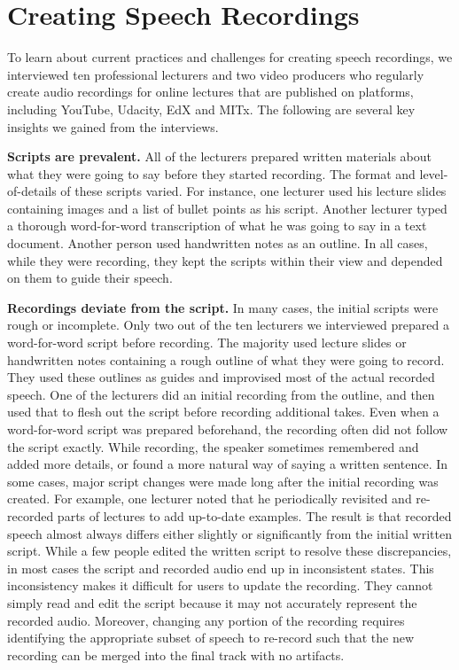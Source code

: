 \section{Creating Speech Recordings}

To learn about current practices and challenges for creating speech recordings, we interviewed ten professional lecturers and two video producers who regularly create audio recordings for online lectures that are published on platforms, including YouTube, Udacity, EdX and MITx. The following are several key insights we gained from the interviews.

\textbf{Scripts are prevalent.} All of the lecturers prepared written materials about what they were going to say before they started recording. The format and level-of-details of these scripts varied. For instance, one lecturer used his lecture slides containing images and a list of bullet points as his script. Another lecturer typed a thorough word-for-word transcription of what he was going to say in a text document. Another person used handwritten notes as an outline. In all cases, while they were recording, they kept the scripts within their view and depended on them to guide their speech.  

\textbf{Recordings deviate from the script.} In many cases, the initial scripts were rough or incomplete. Only two out of the ten lecturers we interviewed prepared a word-for-word script before recording. The majority used lecture slides or handwritten notes containing a rough outline of what they were going to record. They used these outlines as guides and improvised most of the actual recorded speech. One of the lecturers did an initial recording from the outline, and then used that to flesh out the script before recording additional takes. Even when a word-for-word script was prepared beforehand, the recording often did not follow the script exactly. While recording, the speaker sometimes remembered and added more details, or found a more natural way of saying a written sentence. In some cases, major script changes were made long after the initial recording was created. For example, one lecturer noted that he periodically revisited and re-recorded parts of lectures to add up-to-date examples. The result is that recorded speech almost always differs either slightly or significantly from the initial written script. 
While a few people edited the written script to resolve these discrepancies, in most cases the script and recorded audio end up in inconsistent states. This inconsistency makes it difficult for users to update the recording. They cannot simply read and edit the script because it may not accurately represent the recorded audio. Moreover,  changing any portion of the recording requires identifying the appropriate subset of speech to re-record such that the new recording can be merged into the final track with no artifacts.

